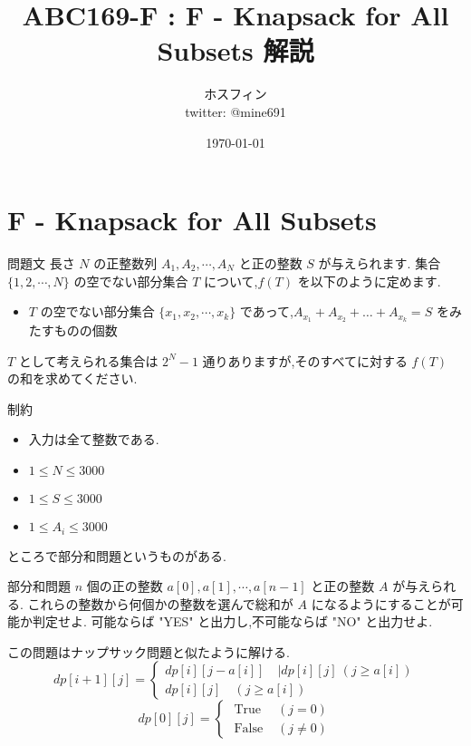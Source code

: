 \documentclass[dvipdfmx,12pt]{beamer}%
\title{ABC169-F : F - Knapsack for All Subsets 解説}
\author{ホスフィン \\ twitter: @mine691}
\date{\today}
\begin{document}
\maketitle

\section{F - Knapsack for All Subsets}

\begin{frame}
\begin{block}{問題文}
長さ $ N $ の正整数列 
$A_1, A_2, \cdots, A_N $ と正の整数 $ S $ が与えられます.
集合 $ \{1, 2, \cdots, N \} $ の空でない部分集合 $ T $ について,$ f(T) $ を以下のように定めます.\\

\begin{itemize}
\item $ T $ の空でない部分集合 $\{x_1, x_2, \cdots, x_k \}$ であって,$A_{x_1} + A_{x_2} + \dots + A_{x_k} = S$ をみたすものの個数
\end{itemize}

$ T $ として考えられる集合は $ 2^{N} - 1 $ 通りありますが,そのすべてに対する $f(T)$ の和を求めてください.
\end{block}

\begin{exampleblock}{制約}
\begin{itemize}
	\item 入力は全て整数である. 
	\item $1 \leq N \leq 3000$
	\item $1 \leq S \leq 3000$
	\item $1 \leq A_{i} \leq 3000$
\end{itemize}
\end{exampleblock}
\end{frame}

\begin{frame}
ところで部分和問題というものがある.

\begin{alertblock}{部分和問題}
$n$ 個の正の整数 $ a[0], a[1], \cdots ,a[n - 1] $ と正の整数 $ A $ が与えられる.
これらの整数から何個かの整数を選んで総和が $ A $ になるようにすることが可能か判定せよ.
可能ならば "YES" と出力し,不可能ならば "NO" と出力せよ.
\end{alertblock}

この問題はナップサック問題と似たように解ける.\\
\[
dp [i+1][j] = \left\{\begin{array}{l}
dp [i][j - a[i]] \quad | dp[i][j] \ (j \geq a[i]) \\
dp[i][j] \quad(j \geq a[i])
\end{array}\right.
\]
\[
dp[0][j]=\left\{\begin{array}{ll}
\text { True } & (j = 0) \\
\text { False } & (j \neq 0)
\end{array}\right.
\]
\end{frame}
\end{document}
